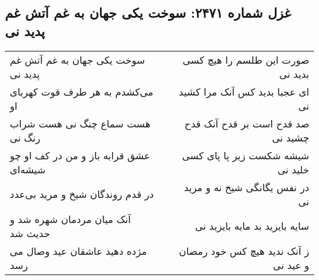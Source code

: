 \begin{center}
\section*{غزل شماره ۲۴۷۱: سوخت یکی جهان به غم آتش غم پدید نی}
\label{sec:2471}
\begin{longtable}{l p{0.5cm} r}
سوخت یکی جهان به غم آتش غم پدید نی
&&
صورت این طلسم را هیچ کسی بدید نی
\\
می‌کشدم به هر طرف قوت کهربای او
&&
ای عجبا بدید کس آنک مرا کشید نی
\\
هست سماع چنگ نی هست شراب رنگ نی
&&
صد قدح است بر قدح آنک قدح چشید نی
\\
عشق قرابه باز و من در کف او چو شیشه‌ای
&&
شیشه شکست زیر پا پای کسی خلید نی
\\
در قدم روندگان شیخ و مرید بی‌عدد
&&
در نفس یگانگی شیخ نه و مرید نی
\\
آنک میان مردمان شهره شد و حدیث شد
&&
سایه بایزید بد مایه بایزید نی
\\
مژده دهید عاشقان عید وصال می رسد
&&
ز آنک ندید هیچ کس خود رمضان و عید نی
\\
\end{longtable}
\end{center}
